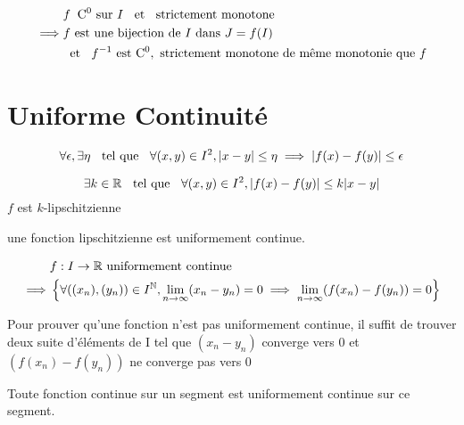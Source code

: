 \begin{thm}[de la bijection]
\begin{align*}
            &f \;\; \mathrm{C^{0}} \text{ sur } I \;\;\text{ et }\;\; \!\! \text{ strictement monotone } \\ 
\implies    &f \text{ est une bijection de } I \text{ dans } J = f(I) \\
            &\!\! \;\;\text{ et }\;\; f^{-1} \text{ est } \mathrm{C^{0}}, \text{ strictement monotone } \!\! 
                \text{ de même monotonie que } f
\end{align*}
\end{thm}

\section{Uniforme Continuité}

\begin{dfn}
\[
\forall \epsilon, \exists \eta \;\;\text{ tel que }\;\; \forall (x, y) \in I^2,
|x - y| \leq \eta \implies |f(x) - f(y)| \leq \epsilon
\]
\end{dfn}

\begin{dfn}
\[
    \exists k \in \mathbb{R} \;\;\text{ tel que }\;\; \forall (x, y) \in I^2, |f(x) - f(y)| \leq k|x - y|
\]
$f$ est $k$-lipschitzienne
\end{dfn}

\begin{prp}
une fonction lipschitzienne est uniformement continue.
\end{prp}

\begin{prp}
\begin{align*}
            &f : I \to \mathbb{R} \text{ uniformement continue } \\
\implies    &\left \{ \forall ((x_n), (y_n)) \in I^{\mathbb{N}}, \lim\limits_{n \to \infty} (x_n - y_n) = 0
            \implies \lim\limits_{n \to \infty} (f(x_n) - f(y_n)) = 0 \right \}
\end{align*}
\end{prp}

\begin{rem}
Pour prouver qu'une fonction n'est pas uniformement continue,
il suffit de trouver deux suite d'éléments de I tel que
$(x_n - y_n)$ converge vers 0 et $(f(x_n) - f(y_n))$ ne converge
pas vers 0
\end{rem}

\begin{thm}[de Heine]
Toute fonction continue sur un segment est uniformement continue sur
ce segment.
\end{thm}


